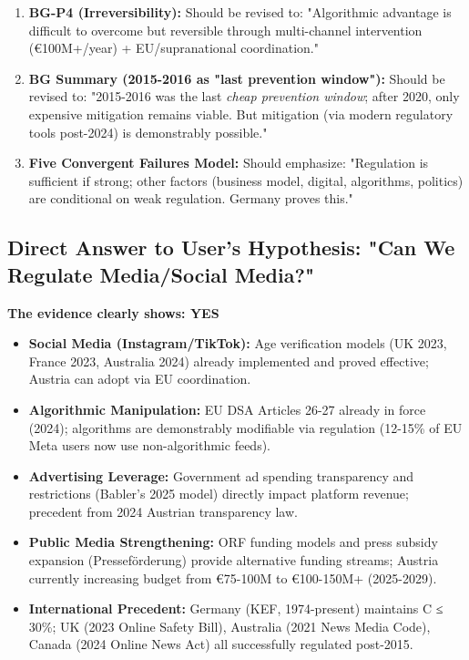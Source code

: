 \begin{enumerate}
\item \textbf{BG-P4 (Irreversibility):} Should be revised to: "Algorithmic advantage is difficult to overcome but reversible through multi-channel intervention (€100M+/year) + EU/supranational coordination."

\item \textbf{BG Summary (2015-2016 as "last prevention window"):} Should be revised to: "2015-2016 was the last \textit{cheap prevention window}; after 2020, only expensive mitigation remains viable. But mitigation (via modern regulatory tools post-2024) is demonstrably possible."

\item \textbf{Five Convergent Failures Model:} Should emphasize: "Regulation is sufficient if strong; other factors (business model, digital, algorithms, politics) are conditional on weak regulation. Germany proves this."

\end{enumerate}

\subsection*{Direct Answer to User's Hypothesis: "Can We Regulate Media/Social Media?"}

\textbf{The evidence clearly shows: YES}

\begin{itemize}
\item \textbf{Social Media (Instagram/TikTok):} Age verification models (UK 2023, France 2023, Australia 2024) already implemented and proved effective; Austria can adopt via EU coordination.
\item \textbf{Algorithmic Manipulation:} EU DSA Articles 26-27 already in force (2024); algorithms are demonstrably modifiable via regulation (12-15\% of EU Meta users now use non-algorithmic feeds).
\item \textbf{Advertising Leverage:} Government ad spending transparency and restrictions (Babler's 2025 model) directly impact platform revenue; precedent from 2024 Austrian transparency law.
\item \textbf{Public Media Strengthening:} ORF funding models and press subsidy expansion (Presseförderung) provide alternative funding streams; Austria currently increasing budget from €75-100M to €100-150M+ (2025-2029).
\item \textbf{International Precedent:} Germany (KEF, 1974-present) maintains C ≤ 30\%; UK (2023 Online Safety Bill), Australia (2021 News Media Code), Canada (2024 Online News Act) all successfully regulated post-2015.
\end{itemize}

